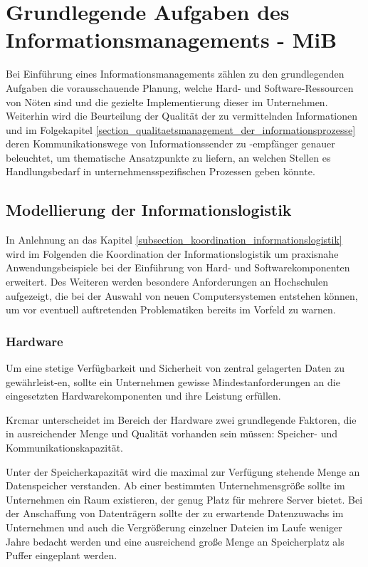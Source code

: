 \section{Grundlegende Aufgaben des Informationsmanagements - MiB}
\label{grundlegende_aufgaben_des_informationsmanagements}
Bei Einführung eines Informationsmanagements zählen zu den grundlegenden Aufgaben die 
vorausschauende Planung, welche Hard- und Software-Ressourcen von Nöten sind und die 
gezielte Implementierung dieser im Unternehmen. Weiterhin wird die Beurteilung der Qualität 
der zu vermittelnden Informationen und im Folgekapitel \ref{section_qualitaetsmanagement_der_informationsprozesse} deren Kommunikationswege von 
Informationssender zu -empfänger genauer beleuchtet, um thematische Ansatzpunkte zu 
liefern, an welchen Stellen es Handlungsbedarf in unternehmensspezifischen Prozessen 
geben könnte. 

\subsection{Modellierung der Informationslogistik}
In Anlehnung an das Kapitel \ref{subsection_koordination_informationslogistik} wird im Folgenden die Koordination der Informationslogistik um praxisnahe Anwendungsbeispiele bei der Einführung von 
Hard- und Softwarekomponenten erweitert. Des Weiteren werden besondere Anforderungen an 
Hochschulen aufgezeigt, die bei der Auswahl von neuen Computersystemen entstehen können, 
um vor eventuell auftretenden Problematiken bereits im Vorfeld zu warnen.

\subsubsection{Hardware}
Um eine stetige Verfügbarkeit und Sicherheit von zentral gelagerten Daten zu gewährleist-en, 
sollte ein Unternehmen gewisse Mindestanforderungen an die eingesetzten Hardwarekomponenten 
und ihre Leistung erfüllen. 

Krcmar unterscheidet im Bereich der Hardware zwei grundlegende Faktoren, die in ausreichender 
Menge und Qualität vorhanden sein müssen: Speicher- und Kommunikationskapazität. 

Unter der Speicherkapazität wird die maximal zur Verfügung stehende Menge an Datenspeicher verstanden. 
Ab einer bestimmten Unternehmensgröße sollte im Unternehmen ein Raum existieren, der genug Platz 
für mehrere Server bietet. Bei der Anschaffung von Datenträgern sollte der zu erwartende 
Datenzuwachs im Unternehmen und auch die Vergrößerung einzelner Dateien im Laufe weniger Jahre 
bedacht werden und eine ausreichend große Menge an Speicherplatz als Puffer eingeplant werden. 

